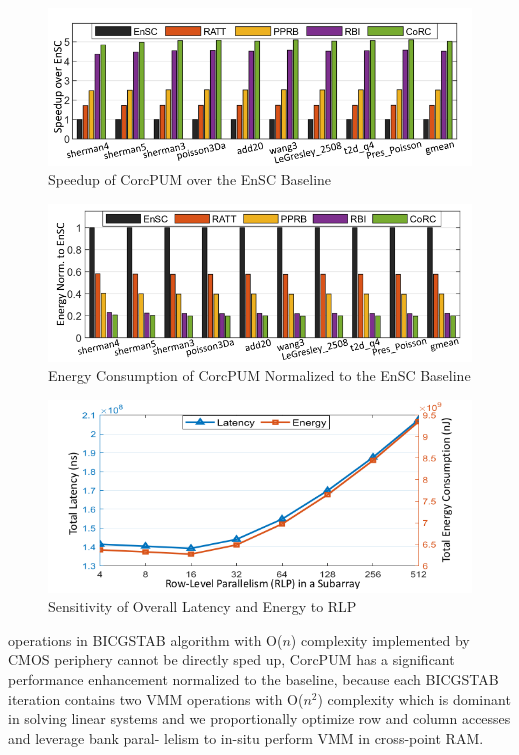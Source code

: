 \documentclass{article}
\begin{document}
\begin{itemize}
\begin{enumerate}
 					\begin{figure}[h]
 						\centering
 						\includegraphics[width=0.7\linewidth]{images/fig9}
 						\caption{Speedup of CorcPUM over the EnSC Baseline}
 						\label{fig:fig9}
 					\end{figure}
 					
 					\begin{figure}[h]
 						\centering
 						\includegraphics[width=0.7\linewidth]{images/fig10}
 						\caption{Energy Consumption of CorcPUM Normalized to the EnSC Baseline}
 						\label{fig:fig10}
 					\end{figure}
 					
 					\begin{figure}[h!]
 						\centering
 						\includegraphics[width=0.7\linewidth]{images/fig11}
 						\caption{Sensitivity of Overall Latency and Energy to RLP}
 						\label{fig:fig11}
 					\end{figure}

 					
 					operations in BICGSTAB algorithm with O($n$) complexity
 					implemented by CMOS periphery cannot be directly sped
 					up, CorcPUM has a significant performance enhancement
 					normalized to the baseline, because each BICGSTAB iteration
 					contains two VMM operations with O($n^2$) complexity which
 					is dominant in solving linear systems and we proportionally
 					optimize row and column accesses and leverage bank paral-
 					lelism to in-situ perform VMM in cross-point RAM.
 					

\end{enumerate}
\end{itemize}
\end{document}
